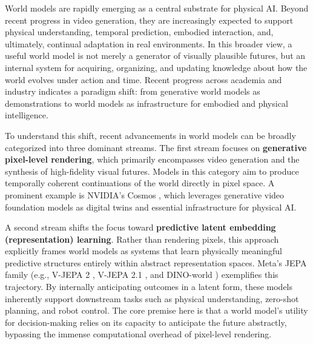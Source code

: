 \documentclass{llmxive}
\begin{document}
World models \cite{WM_Survey} are rapidly emerging as a central substrate for physical AI. Beyond recent progress in video generation, they are increasingly expected to support physical understanding, temporal prediction, embodied interaction, and, ultimately, continual adaptation in real environments. In this broader view, a useful world model is not merely a generator of visually plausible futures, but an internal system for acquiring, organizing, and updating knowledge about how the world evolves under action and time. Recent progress across academia and industry indicates a paradigm shift: from generative world models as demonstrations to world models as infrastructure for embodied and physical intelligence.

To understand this shift, recent advancements in world models can be broadly categorized into three dominant streams. The first stream focuses on \textbf{generative pixel-level rendering}, which primarily encompasses video generation and the synthesis of high-fidelity visual futures. Models in this category aim to produce temporally coherent continuations of the world directly in pixel space. A prominent example is NVIDIA's Cosmos \cite{nvidia2025worldsimulationvideofoundation}, which leverages generative video foundation models as digital twins and essential infrastructure for physical AI. 


A second stream shifts the focus toward \textbf{predictive latent embedding (representation) learning}. Rather than rendering pixels, this approach explicitly frames world models as systems that learn physically meaningful predictive structures entirely within abstract representation spaces. Meta's JEPA family (e.g., V-JEPA 2 \cite{assran2025vjepa2}, V-JEPA 2.1 \cite{murlabadia2026vjepa2_1}, and DINO-world \cite{baldassarre2025featuresdinofoundationvideo}) exemplifies this trajectory. By internally anticipating outcomes in a latent form, these models inherently support downstream tasks such as physical understanding, zero-shot planning, and robot control. The core premise here is that a world model's utility for decision-making relies on its capacity to anticipate the future abstractly, bypassing the immense computational overhead of pixel-level rendering.
\end{document}
